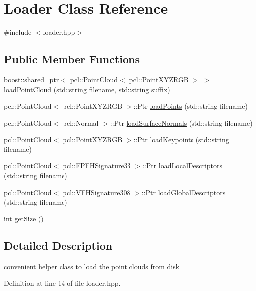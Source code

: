 \hypertarget{class_loader}{}\section{Loader Class Reference}
\label{class_loader}


{\ttfamily \#include $<$loader.\+hpp$>$}

\subsection*{Public Member Functions}
\begin{DoxyCompactItemize}
\item 
boost\+::shared\+\_\+ptr$<$ pcl\+::\+Point\+Cloud$<$ pcl\+::\+Point\+X\+Y\+Z\+R\+GB $>$ $>$ \hyperlink{class_loader_a4a51dc0120d524c010fa2d61c96ffda0}{load\+Point\+Cloud} (std\+::string filename, std\+::string suffix)
\item 
pcl\+::\+Point\+Cloud$<$ pcl\+::\+Point\+X\+Y\+Z\+R\+GB $>$\+::Ptr \hyperlink{class_loader_ae74793144de5bbc0148c257b1f83e0eb}{load\+Points} (std\+::string filename)
\item 
pcl\+::\+Point\+Cloud$<$ pcl\+::\+Normal $>$\+::Ptr \hyperlink{class_loader_a13951e27d82737d95c9ad7b67146f433}{load\+Surface\+Normals} (std\+::string filename)
\item 
pcl\+::\+Point\+Cloud$<$ pcl\+::\+Point\+X\+Y\+Z\+R\+GB $>$\+::Ptr \hyperlink{class_loader_a8cddb9239ed991e33efab83edd7280f7}{load\+Keypoints} (std\+::string filename)
\item 
pcl\+::\+Point\+Cloud$<$ pcl\+::\+F\+P\+F\+H\+Signature33 $>$\+::Ptr \hyperlink{class_loader_ac8938fa9e01e40c2ff21574df60b003a}{load\+Local\+Descriptors} (std\+::string filename)
\item 
pcl\+::\+Point\+Cloud$<$ pcl\+::\+V\+F\+H\+Signature308 $>$\+::Ptr \hyperlink{class_loader_acb76649e253a06ab8c5a475d3fbc74a3}{load\+Global\+Descriptors} (std\+::string filename)
\item 
int \hyperlink{class_loader_ac515e4a910ff4db1e3c1173793bb1bba}{get\+Size} ()
\end{DoxyCompactItemize}


\subsection{Detailed Description}
convenient helper class to load the point clouds from disk 

Definition at line 14 of file loader.\+hpp.



